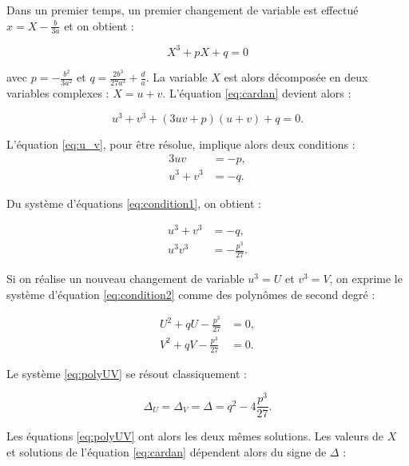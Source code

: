 Dans un premier temps, un premier changement de variable est effectué $x = X - \frac{b}{3a}$ et on obtient : 

\begin{equation}\label{eq:cardan}
X^3+pX+q = 0
\end{equation}

avec $p = -\frac{b^2}{3a^2}$ et $q = \frac{2b^3}{27a^3}+\frac{d}{a}$. La variable $X$ est alors décomposée en deux variables complexes : $X = u+v$. L'équation \ref{eq:cardan} devient alors : 

\begin{equation}\label{eq:u_v}
u^3+v^3+(3uv+p)(u+v)+q = 0.
\end{equation}

L'équation \ref{eq:u_v}, pour être résolue, implique alors deux conditions  : 
\begin{subequations}\label{eq:condition1}
\begin{align}
3uv &= -p,\\
u^3+v^3 &= -q.
\end{align}
\end{subequations}

Du système d'équations \ref{eq:condition1}, on obtient  : 

\begin{subequations}\label{eq:condition2}
\begin{align}
u^3+v^3 &= -q,\\
u^3v^3 &= -\frac{p^3}{27}.
\end{align}
\end{subequations}

Si on réalise un nouveau changement de variable $u^3 = U$ et $v^3 = V$, on exprime le système d'équation \ref{eq:condition2} comme des polynômes de second degré : 

\begin{subequations}\label{eq:polyUV}
\begin{align}
U^2+qU-\frac{p^3}{27} &= 0,\\
V^2+qV-\frac{p^3}{27} &= 0.
\end{align}
\end{subequations}

Le système \ref{eq:polyUV} se résout classiquement : 

\begin{equation}
\Delta_U = \Delta_V = \Delta = q^2-4\frac{p^3}{27}.
\end{equation}

Les équations \ref{eq:polyUV} ont alors les deux mêmes solutions. Les valeurs de $X$ et solutions de l'équation \ref{eq:cardan} dépendent alors du signe de $\Delta$ : 

